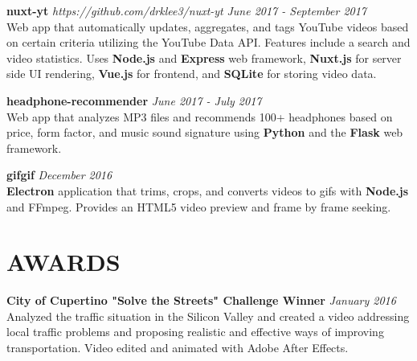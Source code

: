 \documentclass{res}
\begin{document}
\begin{resume}
		{\bf nuxt-yt} \emph{https://github.com/drklee3/nuxt-yt} \hfill \emph{June 2017 - September 2017} \\
			Web app that automatically updates, aggregates, and tags YouTube videos based on certain criteria utilizing the YouTube Data API.
			Features include a search and video statistics.  Uses {\bf Node.js} and {\bf Express} web framework, {\bf Nuxt.js} for server side 
			UI rendering, {\bf Vue.js} for frontend, and {\bf SQLite} for storing video data.

		{\bf headphone-recommender} \hfill \emph{June 2017 - July 2017} \\
			Web app that analyzes MP3 files and recommends 100+ headphones based on price, 
			form factor, and music sound signature using {\bf Python} and the {\bf Flask} web framework.
		
		{\bf gifgif} \hfill \emph{December 2016} \\
			{\bf Electron} application that trims, crops, and converts videos to gifs with {\bf Node.js} and FFmpeg.
			Provides an HTML5 video preview and frame by frame seeking.

		\section{AWARDS}
		\vspace{6pt}

		{\bf City of Cupertino "Solve the Streets" Challenge Winner} \hfill \emph{January 2016} \\
			Analyzed the traffic situation in the Silicon Valley and created a video addressing local traffic problems
			and proposing realistic and effective ways of improving transportation.  Video edited and animated with Adobe After Effects.

	\end{resume} 
\end{document}
